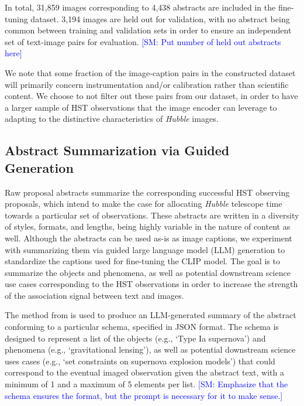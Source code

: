 \documentclass[10pt]{article} %
\newcommand{\SM}[1]{\textcolor{blue}{[SM: #1]}}
\newcommand{\hubble}{\emph{Hubble}\xspace}
\begin{document}
In total, 31,859 images corresponding to 4,438 abstracts are included in the fine-tuning dataset.
%
3,194 images are held out for validation, with no abstract being common between training and validation sets in order to ensure an independent set of text-image pairs for evaluation. \SM{Put number of held out abstracts here}

We note that some fraction of the image-caption pairs in the constructed dataset will primarily concern instrumentation and/or calibration rather than scientific content.
%
We choose to not filter out these pairs from our dataset, in order to have a larger sample of HST observations that the image encoder can leverage to adapting to the distinctive characteristics of \hubble images.


\subsection{Abstract Summarization via Guided Generation}
\label{sec:summarization}

Raw proposal abstracts summarize the corresponding successful HST observing proposals, which intend to make the case for allocating \hubble telescope time towards a particular set of observations.
%
These abstracts are written in a diversity of styles, formats, and lengths, being highly variable in the nature of content as well.
%
Although the abstracts can be used as-is as image captions, we experiment with summarizing them via guided large language model (LLM) generation to standardize the captions used for fine-tuning the CLIP model.
%
The goal is to summarize the objects and phenomena, as well as potential downstream science use cases corresponding to the HST observations in order to increase the strength of the association signal between text and images.

The method from \cite{willard2023efficient} is used to produce an LLM-generated summary of the abstract conforming to a particular schema, specified in JSON format.
%
The schema is designed to represent a list of the objects (e.g., `Type Ia supernova') and phenomena (e.g., `gravitational lensing'), as well as potential downstream science uses cases (e.g., `set constraints on supernova explosion models') that could correspond to the eventual imaged observation given the abstract text, with a minimum of 1 and a maximum of 5 elements per list. \SM{Emphasize that the schema ensures the format, but the prompt is necessary for it to make sense.}
\end{document}
